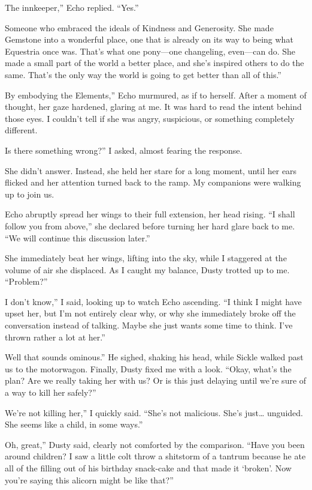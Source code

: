 \leavevmode{}The innkeeper,” Echo replied. “Yes.”

\leavevmode{}Someone who embraced the ideals of Kindness and Generosity. She made Gemstone into a wonderful place, one that is already on its way to being what Equestria once was. That’s what one pony—one changeling, even—can do. She made a small part of the world a better place, and she’s inspired others to do the same. That’s the only way the world is going to get better than all of this.”

\leavevmode{}By embodying the Elements,” Echo murmured, as if to herself. After a moment of thought, her gaze hardened, glaring at me. It was hard to read the intent behind those eyes. I couldn’t tell if she was angry, suspicious, or something completely different.

\leavevmode{}Is there something wrong?” I asked, almost fearing the response.

She didn’t answer. Instead, she held her stare for a long moment, until her ears flicked and her attention turned back to the ramp. My companions were walking up to join us.

Echo abruptly spread her wings to their full extension, her head rising. “I shall follow you from above,” she declared before turning her hard glare back to me. “We will continue this discussion later.”

She immediately beat her wings, lifting into the sky, while I staggered at the volume of air she displaced. As I caught my balance, Dusty trotted up to me. “Problem?”

\leavevmode{}I don’t know,” I said, looking up to watch Echo ascending. “I think I might have upset her, but I’m not entirely clear why, or why she immediately broke off the conversation instead of talking. Maybe she just wants some time to think. I’ve thrown rather a lot at her.”

\leavevmode{}Well that sounds ominous.” He sighed, shaking his head, while Sickle walked past us to the motorwagon. Finally, Dusty fixed me with a look. “Okay, what’s the plan? Are we really taking her with us? Or is this just delaying until we’re sure of a way to kill her safely?”

\leavevmode{}We’re not killing her,” I quickly said. “She’s not malicious. She’s just… unguided. She seems like a child, in some ways.”

\leavevmode{}Oh, great,” Dusty said, clearly not comforted by the comparison. “Have you been around children? I saw a little colt throw a shitstorm of a tantrum because he ate all of the filling out of his birthday snack-cake and that made it ‘broken’. Now you’re saying this alicorn might be like that?”

